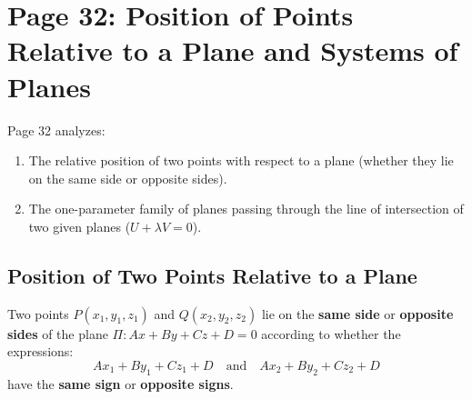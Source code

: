 \section{Page 32: Position of Points Relative to a Plane and Systems of Planes}
\label{sec:page32}

\begin{conceptbox}
Page 32 analyzes:
\begin{enumerate}[noitemsep]
    \item The relative position of two points with respect to a plane (whether they lie on the same side or opposite sides).
    \item The one-parameter family of planes passing through the line of intersection of two given planes ($U + \lambda V = 0$).
\end{enumerate}
\end{conceptbox}

\subsection{Position of Two Points Relative to a Plane}
\begin{theorembox}
Two points $P(x_1, y_1, z_1)$ and $Q(x_2, y_2, z_2)$ lie on the \textbf{same side} or \textbf{opposite sides} of the plane $\Pi: Ax + By + Cz + D = 0$ according to whether the expressions:
\begin{equation}
    Ax_1 + By_1 + Cz_1 + D \quad \text{and} \quad Ax_2 + By_2 + Cz_2 + D
\end{equation}
have the \textbf{same sign} or \textbf{opposite signs}.
\end{theorembox}

